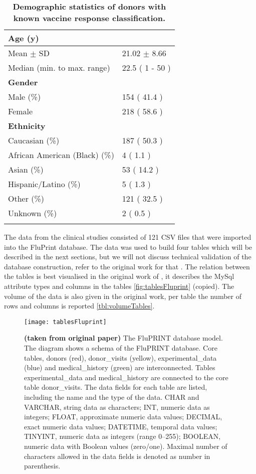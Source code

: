 \begin{table}[htpb]
\centering
\begin{tabular}{ll}
\toprule
\textbf{Age (y)} & \\
\midrule
Mean $\pm$ SD & 21.02 $\pm$ 8.66\\
Median (min. to max. range) & 22.5  ( 1 - 50 )\\
\addlinespace
    \textbf{Gender} & \\
\midrule
Male (\%) & 154 ( 41.4 )\\
Female & 218  ( 58.6 )\\
\addlinespace
    \textbf{Ethnicity} & \\
\midrule
Caucasian (\%) & 187 ( 50.3 )\\
African American (Black) (\%) & 4  ( 1.1 )\\
Asian (\%) & 53  ( 14.2 )\\
Hispanic/Latino (\%) & 5  ( 1.3 )\\
Other (\%) & 121  ( 32.5 )\\
Unknown (\%) & 2  ( 0.5 )\\
\bottomrule{}
\end{tabular}
\caption{\textbf{Demographic statistics of donors with known vaccine response classification.}}\label{tbl:demoStats}
\end{table}

The data from the clinical studies consisted of 121 CSV files that were
imported into the FluPrint database. The data was used to build four tables
which will be described in the next sections, but we will not discuss technical
validation of the database construction, refer to the original work for that
\citep{tomicFluPRINTDatasetMultidimensional2019}.  The relation between the
tables is best visualised in the original work of
\citep{tomicFluPRINTDatasetMultidimensional2019}, it describes the MySql
attribute types and columns in the tables \autoref{fig:tablesFluprint}
(copied). The volume of the data is also given in the original work, per table
the number of rows and columns is reported \autoref{tbl:volumeTables}.

\begin{figure}[htpb]
    \texttt{[image: tablesFluprint]}
    \caption{
        \textbf{(taken from original paper)} The FluPRINT database model. The diagram shows a schema of the FluPRINT
    database. Core tables, donors (red), donor\_visits (yellow),
    experimental\_data (blue) and medical\_history (green) are interconnected.
    Tables experimental\_data and medical\_history are connected to the core
    table donor\_visits. The data fields for each table are listed, including
    the name and the type of the data. CHAR and VARCHAR, string data as
    characters; INT, numeric data as integers; FLOAT, approximate numeric data
    values; DECIMAL, exact numeric data values; DATETIME, temporal data values;
    TINYINT, numeric data as integers (range 0–255); BOOLEAN, numeric data with
    Boolean values (zero/one). Maximal number of characters allowed in the data
    fields is denoted as number in parenthesis.
    }\label{fig:tablesFluprint}
\end{figure}

